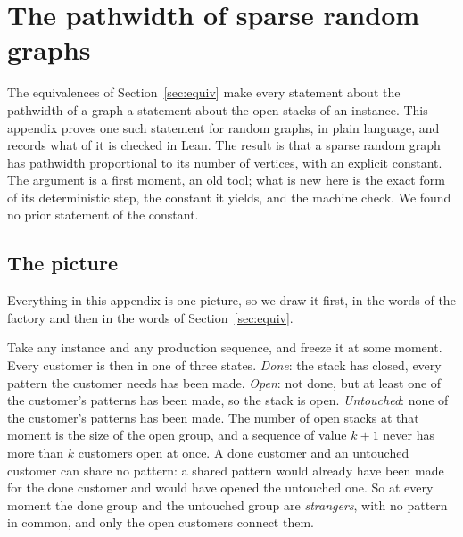 \section{The pathwidth of sparse random graphs}
\label{app:random}

The equivalences of Section~\ref{sec:equiv} make every statement about the
pathwidth of a graph a statement about the open stacks of an instance. This
appendix proves one such statement for random graphs, in plain language, and
records what of it is checked in Lean. The result is that a sparse random
graph has pathwidth proportional to its number of vertices, with an explicit
constant. The argument is a first moment, an old tool; what is new here is the
exact form of its deterministic step, the constant it yields, and the
machine check. We found no prior statement of the constant.

\subsection{The picture}
\label{app:random-picture}

Everything in this appendix is one picture, so we draw it first, in the words
of the factory and then in the words of Section~\ref{sec:equiv}.

Take any instance and any production sequence, and freeze it at some moment.
Every customer is then in one of three states. \emph{Done}: the stack has
closed, every pattern the customer needs has been made. \emph{Open}: not done,
but at least one of the customer's patterns has been made, so the stack is
open. \emph{Untouched}: none of the customer's patterns has been made. The
number of open stacks at that moment is the size of the open group, and a
sequence of value $k+1$ never has more than $k$ customers open at once. A
done customer and an untouched customer can share no pattern: a shared pattern
would already have been made for the done customer and would have opened the
untouched one. So at every moment the done group and the untouched group are
\emph{strangers}, with no pattern in common, and only the open customers
connect them.

